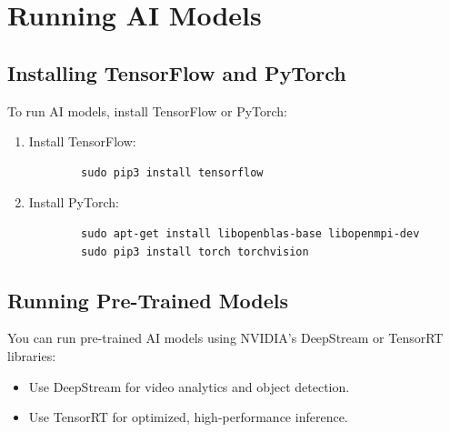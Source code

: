 %
%

\chapter{Running AI Models}

\section{Installing TensorFlow and PyTorch}
To run AI models, install TensorFlow or PyTorch:
\begin{enumerate}
	\item Install TensorFlow:
	\begin{verbatim}
		sudo pip3 install tensorflow
	\end{verbatim}
	\item Install PyTorch:
	\begin{verbatim}
		sudo apt-get install libopenblas-base libopenmpi-dev
		sudo pip3 install torch torchvision
	\end{verbatim}
\end{enumerate}

\section{Running Pre-Trained Models}
You can run pre-trained AI models using NVIDIA's DeepStream or TensorRT libraries:
\begin{itemize}[label=--,left=1.5em]
	\item Use DeepStream for video analytics and object detection.
	\item Use TensorRT for optimized, high-performance inference.
\end{itemize}


